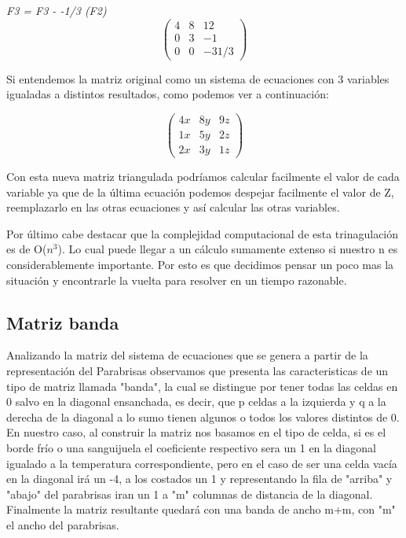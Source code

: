 \emph{F3 = F3 - -1/3 (F2) } 
\[ \left( \begin{array}{ccc}
4 & 8 & 12 \\
0 & 3 & -1 \\
0 & 0 & -31/3 \end{array} \right)\] 

Si entendemos la matriz original como un sistema de ecuaciones con 3 variables igualadas a distintos resultados, como podemos ver a continuación:

\[ \left( \begin{array}{ccc}
4x & 8y & 9z \\
1x & 5y & 2z \\
2x & 3y & 1z \end{array} \right)\] 

Con esta nueva matriz triangulada podríamos calcular facilmente el valor de cada variable ya que de la última ecuación podemos despejar facilmente el valor de Z, reemplazarlo en las otras ecuaciones y así calcular las otras variables.


\newpage

Por último cabe destacar que la complejidad computacional de esta trinagulación es de O($n^3$). Lo cual puede llegar a un cálculo sumamente extenso si nuestro n es considerablemente importante. Por esto es que decidimos pensar un poco mas la situación y encontrarle la vuelta para resolver en un tiempo razonable.

\subsection{Matriz banda}

Analizando la matriz del sistema de ecuaciones que se genera a partir de la representación del Parabrisas observamos que presenta las caracteristicas de un tipo de matriz llamada "banda", la cual se distingue por tener todas las celdas en 0 salvo en la diagonal ensanchada, es decir, que p celdas a la izquierda y q a la derecha de la diagonal a lo sumo tienen algunos o todos los valores distintos de 0. En nuestro caso, al construir la matriz nos basamos en el tipo de celda, si es el borde frío o una sanguijuela el coeficiente respectivo sera un 1 en la diagonal igualado a la temperatura correspondiente, pero en el caso de ser una celda vacía en la diagonal irá un -4, a los costados un 1 y representando la fila de "arriba" y "abajo" del parabrisas iran un 1 a "m" columnas de distancia de la diagonal. Finalmente la matriz resultante quedará con una banda de ancho m+m, con "m" el ancho del parabrisas.

